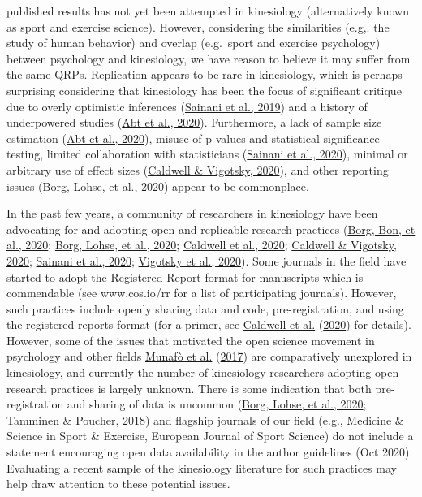 \documentclass[]{cik}%
\begin{document}
published results has not yet been attempted in kinesiology
(alternatively known as sport and exercise science). However,
considering the similarities (e.g,. the study of human behavior) and
overlap (e.g.~sport and exercise psychology) between psychology and
kinesiology, we have reason to believe it may suffer from the same QRPs.
Replication appears to be rare in kinesiology, which is perhaps
surprising considering that kinesiology has been the focus of
significant critique due to overly optimistic inferences
(\protect\hyperlink{ref-Sainani_Lohse_Jones_Vickers_2019}{Sainani et
al., 2019}) and a history of underpowered studies
(\protect\hyperlink{ref-Abt_Boreham_Davison_Jackson_Nevill_Wallace_Williams_2020}{Abt
et al., 2020}). Furthermore, a lack of sample size estimation
(\protect\hyperlink{ref-Abt_Boreham_Davison_Jackson_Nevill_Wallace_Williams_2020}{Abt
et al., 2020}), misuse of p-values and statistical significance testing,
limited collaboration with statisticians
(\protect\hyperlink{ref-sainani2020}{Sainani et al., 2020}), minimal or
arbitrary use of effect sizes
(\protect\hyperlink{ref-Caldwell_Vigotsky_2020}{Caldwell \& Vigotsky,
2020}), and other reporting issues
(\protect\hyperlink{ref-Borg_Lohse_Sainani_2020}{Borg, Lohse, et al.,
2020}) appear to be commonplace.

In the past few years, a community of researchers in kinesiology have
been advocating for and adopting open and replicable research practices
(\protect\hyperlink{ref-Borg_Bon_Sainani_Baguley_Tierney_Drovandi_2020}{Borg,
Bon, et al., 2020};
\protect\hyperlink{ref-Borg_Lohse_Sainani_2020}{Borg, Lohse, et al.,
2020}; \protect\hyperlink{ref-caldwell_moving_2020}{Caldwell et al.,
2020}; \protect\hyperlink{ref-Caldwell_Vigotsky_2020}{Caldwell \&
Vigotsky, 2020}; \protect\hyperlink{ref-sainani2020}{Sainani et al.,
2020};
\protect\hyperlink{ref-Vigotsky_Nuckols_Heathers_Krieger_Schoenfeld_Steele_2020}{Vigotsky
et al., 2020}). Some journals in the field have started to adopt the
Registered Report format for manuscripts which is commendable (see
www.cos.io/rr for a list of participating journals). However, such
practices include openly sharing data and code, pre-registration, and
using the registered reports format (for a primer, see
\protect\hyperlink{ref-caldwell_moving_2020}{Caldwell et al.}
(\protect\hyperlink{ref-caldwell_moving_2020}{2020}) for details).
However, some of the issues that motivated the open science movement in
psychology and other fields
\protect\hyperlink{ref-munafo_manifesto_2017}{Munafò et al.}
(\protect\hyperlink{ref-munafo_manifesto_2017}{2017}) are comparatively
unexplored in kinesiology, and currently the number of kinesiology
researchers adopting open research practices is largely unknown. There
is some indication that both pre-registration and sharing of data is
uncommon (\protect\hyperlink{ref-Borg_Lohse_Sainani_2020}{Borg, Lohse,
et al., 2020}; \protect\hyperlink{ref-Tamminen_Poucher_2018}{Tamminen \&
Poucher, 2018}) and flagship journals of our field (e.g., Medicine \&
Science in Sport \& Exercise, European Journal of Sport Science) do not
include a statement encouraging open data availability in the author
guidelines (Oct 2020). Evaluating a recent sample of the kinesiology
literature for such practices may help draw attention to these potential
issues.
\end{document}
